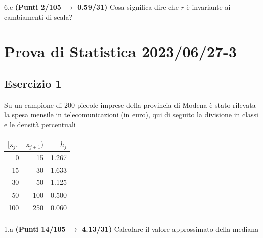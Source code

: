 \documentclass[
  11pt,
]{book}
\theoremstyle{mytheoremstyle}
\theoremstyle{mydefstyle}
\begin{document}
6.e \textbf{(Punti 2/105 \(\rightarrow\) 0.59/31)} Cosa significa dire che \(r\) è invariante ai cambiamenti di scala?

\section{Prova di Statistica 2023/06/27-3}\label{prova-di-statistica-20230627-3}

\subsection{Esercizio 1}\label{esercizio-1-30}

Su un campione di \(200\) piccole imprese della provincia di Modena è stato rilevata la spesa mensile in telecomunicazioni (in euro), qui di seguito
la divisione in classi e le densità percentuali

\begin{table}[H]
\centering
\begin{tabular}{rrr}
\toprule
$[\text{x}_j,$ & $\text{x}_{j+1})$ & $h_j$\\
\midrule
0 & 15 & 1.267\\
15 & 30 & 1.633\\
30 & 50 & 1.125\\
50 & 100 & 0.500\\
100 & 250 & 0.060\\
 &  & \\
\bottomrule
\end{tabular}
\end{table}

1.a \textbf{(Punti 14/105 \(\rightarrow\) 4.13/31)} Calcolare il valore approssimato della mediana
\end{document}
